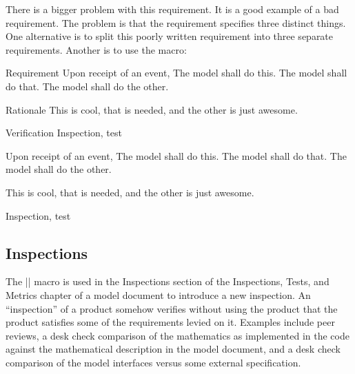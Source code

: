 There is a bigger problem with this requirement. It is a good example
of a bad requirement.
The problem is that the requirement specifies three distinct things.
One alternative is to split this poorly written requirement into three separate
requirements. Another is to use the  macro:
\begin{codeblock}
\label{reqt:yet_another_label}
\begin{description:}
\item[Requirement]
 Upon receipt of an event,
 \label{reqt:yet_another_label_this}
 The model shall do this.
 \label{reqt:yet_another_label_that}
 The model shall do that.
 \label{reqt:yet_another_label_other}
 The model shall do the other.
\item[Rationale]
  This is cool, that is needed, and the other is just awesome.
\item[Verification]
  Inspection, test
\end{description:}
\end{codeblock}

\def\ModelPrefix{Example}
\label{reqt:yet_another_label}
\begin{description:}
\item[Requirement]
 Upon receipt of an event,
 \label{reqt:yet_another_label_this}
 The model shall do this.
 \label{reqt:yet_another_label_that}
 The model shall do that.
 \label{reqt:yet_another_label_other}
 The model shall do the other.
\item[Rationale]
  This is cool, that is needed, and the other is just awesome.
\item[Verification]
  Inspection, test
\end{description:}


\subsection{Inspections}\label{sec:inspections}
The |\inspection| macro is used in the Inspections section of the Inspections,
Tests, and Metrics chapter of a model document to introduce a new inspection.
An ``inspection'' of a product somehow verifies without using the product that
the product satisfies some of the requirements levied on it.
Examples include peer reviews,
a desk check comparison of the mathematics as implemented in the code against
the mathematical description in the model document, and a desk check comparison
of the model interfaces versus some external specification.

